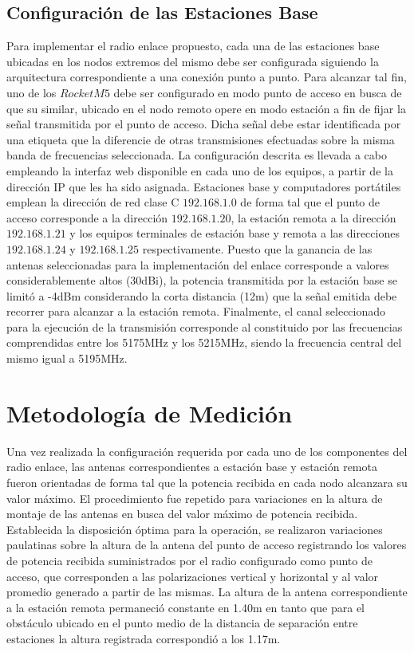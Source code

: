 \documentclass[conference]{IEEEtran}
\begin{document}
\subsection{Configuración de las Estaciones Base}
Para implementar el radio enlace propuesto, cada una de las estaciones base ubicadas en los nodos extremos del 
mismo debe ser configurada siguiendo la arquitectura correspondiente a una conexión punto a punto. Para alcanzar 
tal fin, uno de los $RocketM5$ debe ser configurado en modo punto de acceso en busca de que su similar, ubicado en el
nodo remoto opere en modo estación a fin de fijar la señal transmitida por el punto de acceso. Dicha señal debe estar
identificada por una etiqueta que la diferencie de otras transmisiones efectuadas sobre la misma banda de frecuencias 
seleccionada. La configuración descrita es llevada a cabo empleando la interfaz web disponible en cada uno de los equipos,
a partir de la dirección IP que les ha sido asignada. Estaciones base y computadores portátiles emplean la dirección de red 
clase C $\textit{192.168.1.0}$ de forma tal que el punto de acceso corresponde a la dirección $\textit{192.168.1.20}$, la estación remota a
la dirección $\textit{192.168.1.21}$ y los equipos terminales de estación base y remota a las direcciones $\textit{192.168.1.24}$ y $\textit{192.168.1.25}$
respectivamente. Puesto que la ganancia de las antenas seleccionadas para la implementación del enlace corresponde a valores
considerablemente altos (30dBi), la potencia transmitida por la estación base se limitó a -4dBm considerando la corta 
distancia (12m) que la señal emitida debe recorrer para alcanzar a la estación remota. Finalmente, el canal seleccionado 
para la ejecución de la transmisión corresponde al constituido por las frecuencias comprendidas entre los 5175MHz y los 5215MHz, 
siendo la frecuencia central del mismo igual a 5195MHz.
\section{Metodología de Medición}
Una vez realizada la configuración requerida por cada uno de los componentes del radio enlace, las antenas correspondientes a 
estación base y estación remota fueron orientadas de forma tal que la potencia recibida en cada nodo alcanzara su valor máximo. El 
procedimiento fue repetido para variaciones en la altura de montaje de las antenas en busca del valor máximo de potencia recibida. 
Establecida la disposición óptima para la operación, se realizaron variaciones paulatinas sobre la altura de la antena del punto de acceso
registrando los valores de potencia recibida suministrados por el radio configurado como punto de acceso, que corresponden a las polarizaciones vertical y horizontal 
y al valor promedio generado a partir de las mismas. La altura de la antena correspondiente a la estación remota permaneció constante en 1.40m en tanto
que para el obstáculo ubicado en el punto medio de la distancia de separación entre estaciones la altura registrada correspondió a los 1.17m.
\end{document}
